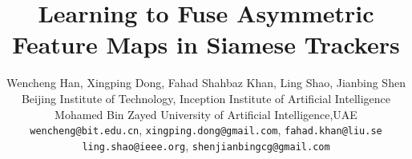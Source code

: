 \documentclass[10pt,twocolumn,letterpaper,final]{cvpr}
\begin{document}
\title{Learning to Fuse Asymmetric Feature Maps in Siamese Trackers}

\author{
Wencheng Han, Xingping Dong, Fahad Shahbaz Khan, Ling Shao, Jianbing Shen\\

Beijing Institute of Technology, Inception Institute of Artificial Intelligence \\ Mohamed Bin Zayed University of Artificial Intelligence,UAE \\
{\tt\small wencheng@bit.edu.cn}, {\tt\small xingping.dong@gmail.com}, {\tt\small fahad.khan@liu.se} \\ {\tt\small ling.shao@ieee.org}, {\tt\small shenjianbingcg@gmail.com}
}







\pagestyle{empty}
\maketitle
\end{document}
